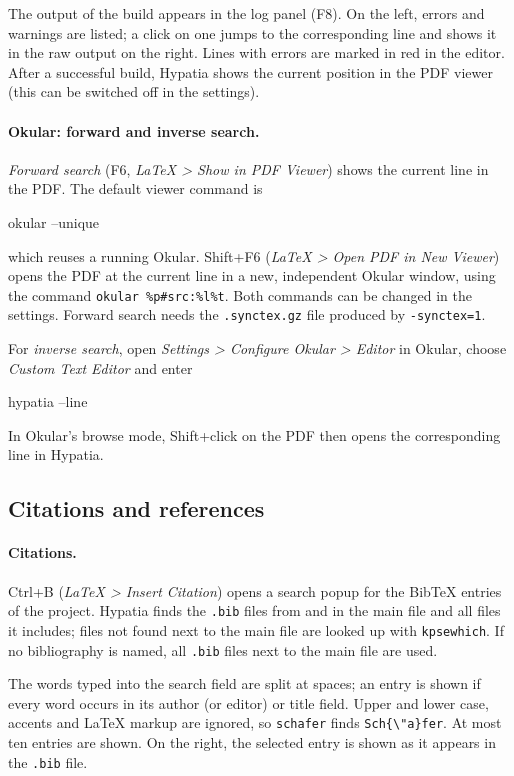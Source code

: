 \documentclass[11pt]{article}
\newcommand{\key}[1]{\textsf{#1}}
\newcommand{\menu}[1]{\textsf{\textit{#1}}}
\begin{document}
    The output of the build appears in the log panel (\key{F8}). On the left, errors and warnings are listed; a click on one jumps to the corresponding line and shows it in the raw output on the right. Lines with errors are marked in red in the editor. After a successful build, Hypatia shows the current position in the PDF viewer (this can be switched off in the settings).

    \paragraph{Okular: forward and inverse search.} \emph{Forward search} (\key{F6}, \menu{LaTeX > Show in PDF Viewer}) shows the current line in the PDF. The default viewer command is
    \begin{Code}
okular --unique %
    \end{Code}
    which reuses a running Okular. \key{Shift+F6} (\menu{LaTeX > Open PDF in New Viewer}) opens the PDF at the current line in a new, independent Okular window, using the command \verb+okular %p#src:%l%t+. Both commands can be changed in the settings. Forward search needs the \verb+.synctex.gz+ file produced by \verb+-synctex=1+.

    For \emph{inverse search}, open \menu{Settings > Configure Okular > Editor} in Okular, choose \menu{Custom Text Editor} and enter
    \begin{Code}
hypatia --line %
    \end{Code}
    In Okular's browse mode, \key{Shift}+click on the PDF then opens the corresponding line in Hypatia.


    \subsection{Citations and references}

    \paragraph{Citations.} \key{Ctrl+B} (\menu{LaTeX > Insert Citation}) opens a search popup for the BibTeX entries of the project. Hypatia finds the \verb+.bib+ files from \verb++ and \verb++ in the main file and all files it includes; files not found next to the main file are looked up with \verb+kpsewhich+. If no bibliography is named, all \verb+.bib+ files next to the main file are used.

    The words typed into the search field are split at spaces; an entry is shown if every word occurs in its author (or editor) or title field. Upper and lower case, accents and LaTeX markup are ignored, so \verb+schafer+ finds \verb+Sch{\"a}fer+. At most ten entries are shown. On the right, the selected entry is shown as it appears in the \verb+.bib+ file.
\end{document}
